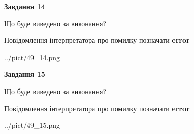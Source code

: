 \documentclass[11pt, ukrainian]{article}
\begin{document}
{\begin {large}
{\begin {center}\textbf{Завдання 14}\end {center}}\par
Що буде виведено за виконання? \par
Повідомлення інтерпретатора про помилку позначати \textbf{error}

\begin{center}
	{../pict/49_14.png}
\end{center}
\newpage

{\begin {center}\textbf{Завдання 15}\end {center}}\par
Що буде виведено за виконання? \par
Повідомлення інтерпретатора про помилку позначати \textbf{error}

\begin{center}
	{../pict/49_15.png}
\end{center}
\newpage

\end {large}}
\end{document}
